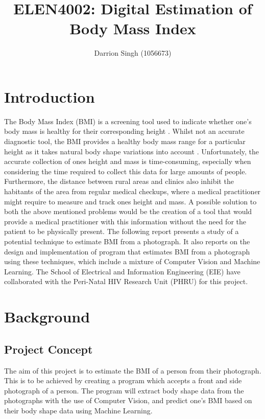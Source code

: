 \documentclass[conference]{IEEEtran}
\title{ELEN4002: Digital Estimation of Body Mass Index}
\author{Darrion Singh (1056673)}
\begin{document}
\maketitle

\begin{abstract}
	
\end{abstract}

\section{Introduction}
The Body Mass Index (BMI) is a screening tool used to indicate whether one's body mass is healthy for their corresponding height \cite{nhsBMI}.
Whilst not an accurate diagnostic tool, the BMI provides a healthy body mass range for a particular height as it takes natural body shape variations into account \cite{nhsBMI}.
Unfortunately, the accurate collection of ones height and mass is time-consuming, especially when considering the time required to collect this data for large amounts of people.
Furthermore, the distance between rural areas and clinics also inhibit the habitants of the area from regular medical checkups, where a medical practitioner might require to measure and track ones height and mass.
A possible solution to both the above mentioned problems would be the creation of a tool that would provide a medical practitioner with this information without the need for the patient to be physically present.
The following report presents a study of a potential technique to estimate BMI from a photograph. It also reports on the design and implementation of program that estimates BMI from a photograph using these techniques, which include a mixture of Computer Vision and Machine Learning.
The School of Electrical and Information Engineering (EIE) have collaborated with the Peri-Natal HIV Research Unit (PHRU) for this project.
\section{Background}
\subsection{Project Concept}
The aim of this project is to estimate the BMI of a person from their photograph.
This is to be achieved by creating a program which accepts a front and side photograph of a person.
The program will extract body shape data from the photographs with the use of Computer Vision, and predict one's BMI based on their body shape data using Machine Learning.
\end{document}

